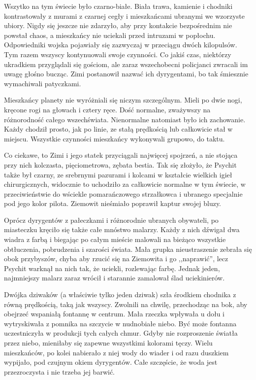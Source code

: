 Wszytko na tym świecie było czarno-białe. Biała trawa, kamienie i chodniki kontrastowały z murami z czarnej cegły i mieszkańcami ubranymi we wzorzyste ubiory.
Nigdy się jeszcze nie zdarzyło, aby przy kontakcie bezpośrednim nie powstał chaos, a mieszkańcy nie uciekali przed intruzami w popłochu. 
Odpowiedniki wojska pojawiały się zazwyczaj w przeciągu dwóch kilopulsów.
Tym razem wszyscy kontynuowali swoje czynności.
Co jakiś czas, niektórzy ukradkiem przyglądali się gościom, ale zaraz wszechobecni policjanci zwracali im uwagę głośno bucząc.
Zimi postanowił nazwać ich dyrygentami, bo tak śmiesznie wymachiwali patyczkami.

Mieszkańcy planety nie wyróżniali się niczym szczególnym. Mieli po dwie nogi, kręcone rogi na głowach i cztery ręce.
Dość normalne, zważywszy na różnorodność całego wszechświata.
Nienormalne natomiast było ich zachowanie. Każdy chodził prosto, jak po linie, ze stałą prędkością lub całkowicie stał w miejscu.
Wszystkie czynności mieszkańcy wykonywali grupowo, do taktu.

Co ciekawe, to Zimi i jego statek przyciągali najwięcej spojrzeń, a nie stojąca przy nich kolczasta, pięciometrowa, zębata bestia.
Tak się złożyło, że Psychit także był czarny, ze srebrnymi pazurami i kolcami w kształcie wielkich igieł chirurgicznych, widocznie to uchodziło za całkowicie normalne w tym świecie, w przeciwieństwie do wściekle pomarańczowego strzałkowca i
ubranego specjalnie pod jego kolor pilota. Ziemowit nieśmiało poprawił kaptur swojej bluzy.

Oprócz dyrygentów z pałeczkami i różnorodnie ubranych obywateli, po miasteczku kręciło się także całe mnóstwo malarzy.
Każdy z nich dźwigał dwa wiadra z farbą i biegając po całym mieście malowali na bieżąco wszystkie obtłuczenia, pobrudzenia i szarości świata.
Mała grupka nieustraszenie zebrała się obok przybyszów, chyba aby rzucić się na Ziemowita i go ,,naprawić'', lecz Psychit warknął na nich tak, że uciekli, rozlewając farbę.
Jednak jeden, najmniejszy malarz zaraz wrócił i starannie zamalował ślad uciekinierów.

\divider{}
Dwójka dziwaków (a właściwie tylko jeden dziwak) szła środkiem chodnika z równą prędkością, taką jak wszyscy.
Zwolnili na chwilę, przechodząc na bok, aby obejrzeć wspaniałą fontannę w centrum.
Mała rzeczka wpływała u dołu i wytryskiwała z pomnika na szczycie w nudnobiałe niebo.
Być może fontanna uczestniczyła w produkcji tych całych chmur.
Gdyby nie rozproszenie światła przez niebo, mieniłaby się zapewne wszystkimi kolorami tęczy.
Wielu mieszkańców, po kolei nabierało z niej wody do wiader i od razu duszkiem wypijało, pod czujnym okiem dyrygentów.
Całe szczęście, że woda jest przezroczysta i nie trzeba jej barwić.

